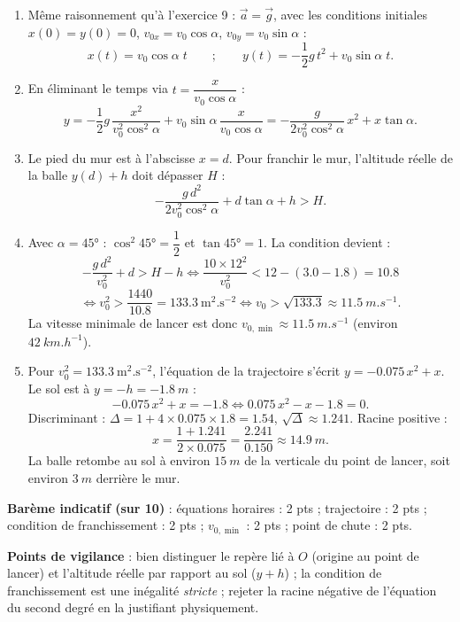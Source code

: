 \documentclass[11pt]{article}
\begin{document}
\begin{corrige}
\begin{enumerate}
\item Même raisonnement qu'à l'exercice 9 : $\vec{a} = \vec{g}$, avec les conditions initiales $x(0)=y(0)=0$, $v_{0x} = v_0\cos\alpha$, $v_{0y} = v_0\sin\alpha$ :
\[ x(t) = v_0\cos\alpha\; t \qquad ; \qquad y(t) = -\frac{1}{2}g\,t^2 + v_0\sin\alpha\; t. \]
\item En éliminant le temps via $t = \dfrac{x}{v_0\cos\alpha}$ :
\[ y = -\frac{1}{2}g\,\frac{x^2}{v_0^2\cos^2\alpha} + v_0\sin\alpha\,\frac{x}{v_0\cos\alpha} = -\frac{g}{2v_0^2\cos^2\alpha}\,x^2 + x\tan\alpha. \]
\item Le pied du mur est à l'abscisse $x = d$. Pour franchir le mur, l'altitude réelle de la balle $y(d) + h$ doit dépasser $H$ :
\[ -\frac{g\,d^2}{2v_0^2\cos^2\alpha} + d\tan\alpha + h > H. \]
\item Avec $\alpha = 45°$ : $\cos^2 45° = \dfrac{1}{2}$ et $\tan 45° = 1$. La condition devient :
\[ -\frac{g\,d^2}{v_0^2} + d > H - h \iff \frac{10\times 12^2}{v_0^2} < 12 - (\num{3,0} - \num{1,8}) = \num{10,8} \]
\[ \iff v_0^2 > \frac{1440}{\num{10,8}} = \num{133,3}\ \mathrm{m^2.s^{-2}} \iff v_0 > \sqrt{\num{133,3}} \approx \SI{11,5}{m.s^{-1}}. \]
La vitesse minimale de lancer est donc $v_{0,\min} \approx \SI{11,5}{m.s^{-1}}$ (environ $\SI{42}{km.h^{-1}}$).
\item Pour $v_0^2 = \num{133,3}\ \mathrm{m^2.s^{-2}}$, l'équation de la trajectoire s'écrit $y = -\num{0,075}\,x^2 + x$. Le sol est à $y = -h = \SI{-1,8}{m}$ :
\[ -\num{0,075}\,x^2 + x = -\num{1,8} \iff \num{0,075}\,x^2 - x - \num{1,8} = 0. \]
Discriminant : $\Delta = 1 + 4\times \num{0,075}\times \num{1,8} = \num{1,54}$, $\sqrt{\Delta} \approx \num{1,241}$. Racine positive :
\[ x = \frac{1 + \num{1,241}}{2\times \num{0,075}} = \frac{\num{2,241}}{\num{0,150}} \approx \SI{14,9}{m}. \]
La balle retombe au sol à environ $\SI{15}{m}$ de la verticale du point de lancer, soit environ $\SI{3}{m}$ derrière le mur.
\end{enumerate}
\textbf{Barème indicatif (sur 10)} : équations horaires : 2 pts ; trajectoire : 2 pts ; condition de franchissement : 2 pts ; $v_{0,\min}$ : 2 pts ; point de chute : 2 pts.\par
\textbf{Points de vigilance} : bien distinguer le repère lié à $O$ (origine au point de lancer) et l'altitude réelle par rapport au sol ($y + h$) ; la condition de franchissement est une inégalité \emph{stricte} ; rejeter la racine négative de l'équation du second degré en la justifiant physiquement.
\end{corrige}
\end{document}
